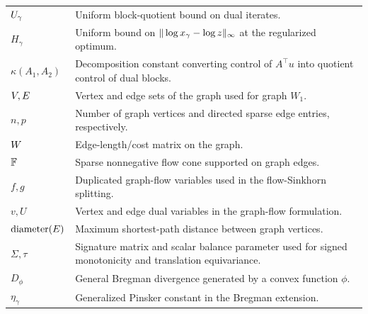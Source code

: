 \begin{longtable}{@{}p{}p{}@{}}
$U_\gamma$ & Uniform block-quotient bound on dual iterates. \\
$H_\gamma$ & Uniform bound on $\|\log x_\gamma-\log z\|_\infty$ at the regularized optimum. \\
$\kappa(A_1,A_2)$ & Decomposition constant converting control of $A^\top u$ into quotient control of dual blocks. \\
$V,E$ & Vertex and edge sets of the graph used for graph $W_1$. \\
$n,p$ & Number of graph vertices and directed sparse edge entries, respectively. \\
$W$ & Edge-length/cost matrix on the graph. \\
$\mathbb{F}$ & Sparse nonnegative flow cone supported on graph edges. \\
$f,g$ & Duplicated graph-flow variables used in the flow-Sinkhorn splitting. \\
$v,U$ & Vertex and edge dual variables in the graph-flow formulation. \\
$\operatorname{diameter}(E)$ & Maximum shortest-path distance between graph vertices. \\
$\Sigma,\tau$ & Signature matrix and scalar balance parameter used for signed monotonicity and translation equivariance. \\
$D_\phi$ & General Bregman divergence generated by a convex function $\phi$. \\
$\eta_\gamma$ & Generalized Pinsker constant in the Bregman extension. \\

\bottomrule
\end{longtable}
